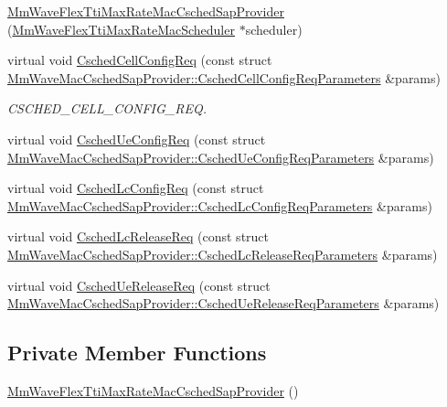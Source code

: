 \begin{DoxyCompactItemize}
\item 
\hyperlink{classns3_1_1MmWaveFlexTtiMaxRateMacCschedSapProvider_a12cdb2c7a53416c9e37a48862cb302cc}{Mm\+Wave\+Flex\+Tti\+Max\+Rate\+Mac\+Csched\+Sap\+Provider} (\hyperlink{classns3_1_1MmWaveFlexTtiMaxRateMacScheduler}{Mm\+Wave\+Flex\+Tti\+Max\+Rate\+Mac\+Scheduler} $\ast$scheduler)
\item 
virtual void \hyperlink{classns3_1_1MmWaveFlexTtiMaxRateMacCschedSapProvider_aab58207e90916afdbf3757a50c8ab6e7}{Csched\+Cell\+Config\+Req} (const struct \hyperlink{structns3_1_1MmWaveMacCschedSapProvider_1_1CschedCellConfigReqParameters}{Mm\+Wave\+Mac\+Csched\+Sap\+Provider\+::\+Csched\+Cell\+Config\+Req\+Parameters} \&params)
\begin{DoxyCompactList}\small\item\em C\+S\+C\+H\+E\+D\+\_\+\+C\+E\+L\+L\+\_\+\+C\+O\+N\+F\+I\+G\+\_\+\+R\+EQ. \end{DoxyCompactList}\item 
virtual void \hyperlink{classns3_1_1MmWaveFlexTtiMaxRateMacCschedSapProvider_a91a5964b92b64d5d3ecd268eeef3caee}{Csched\+Ue\+Config\+Req} (const struct \hyperlink{structns3_1_1MmWaveMacCschedSapProvider_1_1CschedUeConfigReqParameters}{Mm\+Wave\+Mac\+Csched\+Sap\+Provider\+::\+Csched\+Ue\+Config\+Req\+Parameters} \&params)
\item 
virtual void \hyperlink{classns3_1_1MmWaveFlexTtiMaxRateMacCschedSapProvider_a0d25f48f3965e61e2d99db49b471ba06}{Csched\+Lc\+Config\+Req} (const struct \hyperlink{structns3_1_1MmWaveMacCschedSapProvider_1_1CschedLcConfigReqParameters}{Mm\+Wave\+Mac\+Csched\+Sap\+Provider\+::\+Csched\+Lc\+Config\+Req\+Parameters} \&params)
\item 
virtual void \hyperlink{classns3_1_1MmWaveFlexTtiMaxRateMacCschedSapProvider_a6af8f1016e5c95d8c0523a82b6697be5}{Csched\+Lc\+Release\+Req} (const struct \hyperlink{structns3_1_1MmWaveMacCschedSapProvider_1_1CschedLcReleaseReqParameters}{Mm\+Wave\+Mac\+Csched\+Sap\+Provider\+::\+Csched\+Lc\+Release\+Req\+Parameters} \&params)
\item 
virtual void \hyperlink{classns3_1_1MmWaveFlexTtiMaxRateMacCschedSapProvider_aadf573bd74f30f8d66f1351cb59b1fb9}{Csched\+Ue\+Release\+Req} (const struct \hyperlink{structns3_1_1MmWaveMacCschedSapProvider_1_1CschedUeReleaseReqParameters}{Mm\+Wave\+Mac\+Csched\+Sap\+Provider\+::\+Csched\+Ue\+Release\+Req\+Parameters} \&params)
\end{DoxyCompactItemize}
\subsection*{Private Member Functions}
\begin{DoxyCompactItemize}
\item 
\hyperlink{classns3_1_1MmWaveFlexTtiMaxRateMacCschedSapProvider_acd38b900545c0aa0148c64354001995e}{Mm\+Wave\+Flex\+Tti\+Max\+Rate\+Mac\+Csched\+Sap\+Provider} ()
\end{DoxyCompactItemize}
